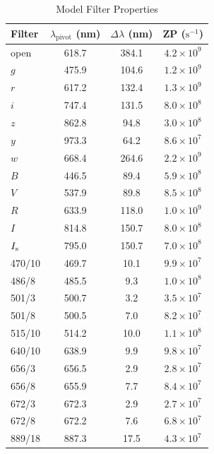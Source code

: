 \begin{table}
\begin{center}
\caption{Model Filter Properties}
\label{table:model-filter-properties}
\medskip
\begin{tabular}{lccc}
\hline
Filter&$\lambda_\mathrm{pivot}$ (nm)&$\Delta\lambda$ (nm)&ZP ($\mathrm{s}^{-1}$)\\
\hline
open		& 618.7& \phantom{}384.1&$4.2 \times 10^{9}$\\
$g$		& 475.9& \phantom{}104.6&$1.2 \times 10^{9}$\\
$r$		& 617.2& \phantom{}132.4&$1.3 \times 10^{9}$\\
$i$			& 747.4& \phantom{}131.5&$8.0 \times 10^{8}$\\
$z$		& 862.8& \phantom{0}94.8&$3.0 \times 10^{8}$\\
$y$		& 973.3& \phantom{0}64.2&$8.6 \times 10^{7}$\\
$w$		& 668.4& \phantom{}264.6&$2.2 \times 10^{9}$\\
$B$		& 446.5& \phantom{0}89.4&$5.9 \times 10^{8}$\\
$V$		& 537.9& \phantom{0}89.8&$8.5 \times 10^{8}$\\
$R$		& 633.9& \phantom{}118.0&$1.0 \times 10^{9}$\\
$I$		& 814.8& \phantom{}150.7&$8.0 \times 10^{8}$\\
$\mbox{$I_\mathrm{s}$}$		& 795.0& \phantom{}150.7&$7.0 \times 10^{8}$\\
470/10	& 469.7& \phantom{0}10.1&$9.9 \times 10^{7}$\\
486/8		& 485.5& \phantom{00}9.3&$1.0 \times 10^{8}$\\
501/3		& 500.7& \phantom{00}3.2&$3.5 \times 10^{7}$\\
501/8		& 500.5& \phantom{00}7.0&$8.2 \times 10^{7}$\\
515/10	& 514.2& \phantom{0}10.0&$1.1 \times 10^{8}$\\
640/10	& 638.9& \phantom{00}9.9&$9.8 \times 10^{7}$\\
656/3		& 656.5& \phantom{00}2.9&$2.8 \times 10^{7}$\\
656/8		& 655.9& \phantom{00}7.7&$8.4 \times 10^{7}$\\
672/3		& 672.3& \phantom{00}2.9&$2.7 \times 10^{7}$\\
672/8		& 672.2& \phantom{00}7.6&$6.8 \times 10^{7}$\\
889/18	& 887.3& \phantom{0}17.5&$4.3 \times 10^{7}$\\
\hline
\end{tabular}
\end{center}
\end{table}

